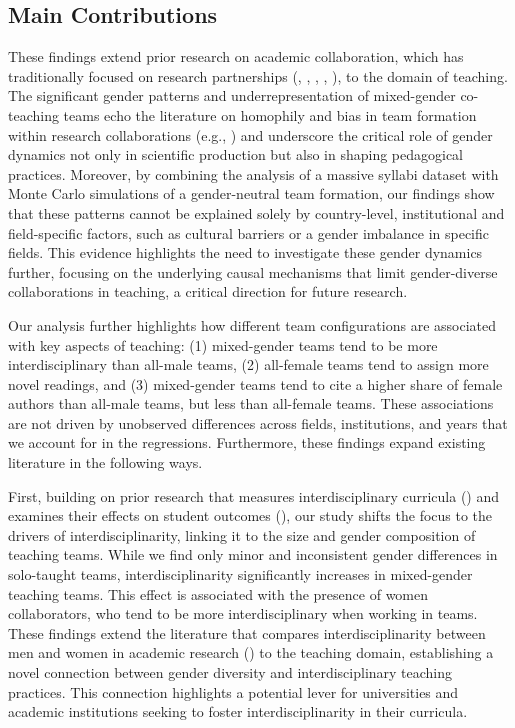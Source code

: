 \documentclass[
  12pt,
]{article}
\begin{document}
\subsection{Main Contributions}\label{main-contributions}

These findings extend prior research on academic collaboration, which has traditionally focused on research partnerships (, , , , ), to the domain of teaching. The significant gender patterns and underrepresentation of mixed-gender co-teaching teams echo the literature on homophily and bias in team formation within research collaborations (e.g., ) and underscore the critical role of gender dynamics not only in scientific production but also in shaping pedagogical practices. Moreover, by combining the analysis of a massive syllabi dataset with Monte Carlo simulations of a gender-neutral team formation, our findings show that these patterns cannot be explained solely by country-level, institutional and field-specific factors, such as cultural barriers or a gender imbalance in specific fields. This evidence highlights the need to investigate these gender dynamics further, focusing on the underlying causal mechanisms that limit gender-diverse collaborations in teaching, a critical direction for future research.

Our analysis further highlights how different team configurations are associated with key aspects of teaching: (1) mixed-gender teams tend to be more interdisciplinary than all-male teams, (2) all-female teams tend to assign more novel readings, and (3) mixed-gender teams tend to cite a higher share of female authors than all-male teams, but less than all-female teams. These associations are not driven by unobserved differences across fields, institutions, and years that we account for in the regressions. Furthermore, these findings expand existing literature in the following ways.

First, building on prior research that measures interdisciplinary curricula () and examines their effects on student outcomes (), our study shifts the focus to the drivers of interdisciplinarity, linking it to the size and gender composition of teaching teams. While we find only minor and inconsistent gender differences in solo-taught teams, interdisciplinarity significantly increases in mixed-gender teaching teams. This effect is associated with the presence of women collaborators, who tend to be more interdisciplinary when working in teams. These findings extend the literature that compares interdisciplinarity between men and women in academic research () to the teaching domain, establishing a novel connection between gender diversity and interdisciplinary teaching practices. This connection highlights a potential lever for universities and academic institutions seeking to foster interdisciplinarity in their curricula.
\end{document}
